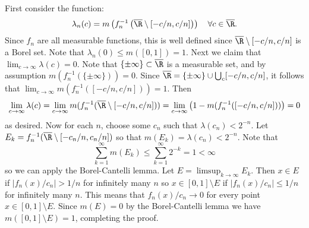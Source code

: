 \documentclass[11pt,letterpaper]{article}
\begin{document}
\begin{solution}
    First consider the function:
    \[
        \lambda_n(c) = m\left(f_n^{-1}\left(\overline{\R} \setminus \left[-c /n, c /n\right]\right)\right)\quad \forall c\in \overline{\R}
    .\] 
    Since $f_n$ are all measurable functions, this is well defined since $\overline{\R}\setminus [-c /n, c /n]$ is a Borel set. Note that $\lambda_n(0)\leq m([0,1])=1$. Next we claim that $\lim_{c\to \infty} \lambda(c)=0$. Note that $\{\pm\infty\}\subset \overline{\R}$ is a measurable set, and by assumption $m(f_n^{-1}(\{\pm\infty\}))=0$. Since $\overline{\R}=\{\pm\infty\}\cup\bigcup_c [-c /n, c /n]$, it follows that $\lim_{c\to\infty}m(f^{-1}_n([-c /n, c /n]))=1$. Then
    \[
        \lim_{c\to\infty} \lambda(c) = \lim_{c\to\infty} m(f^{-1}_n(\overline{\R}\setminus [-c /n, c /n])) = \lim_{c\to\infty}\left(1 - m(f^{-1}_n([-c /n, c /n]))\right)=0
    \]
    as desired. Now for each $n$, choose some $c_n$ such that $\lambda(c_n)<2^{-n}$. Let $E_k=f^{-1}_n(\overline{\R}\setminus [-c_n /n, c_n /n])$ so that $m(E_k)=\lambda(c_n)<2^{-n}$. Note that 
    \[
        \sum^\infty_{k=1}m(E_k)\leq \sum^\infty_{k=1}2^{-k}=1<\infty
    \]
    so we can apply the Borel-Cantelli lemma. Let $E=\limsup_{k\to \infty} E_k$. Then $x\in E$ if $|f_n(x) /c_n|>1 /n$ for infinitely many $n$ so $x\in [0,1]\setminus E$ if $|f_n(x) / c_n|\leq 1 /n$ for infinitely many $n$. This means that $f_n(x) /c_n \to 0$ for every point $x\in [0,1]\setminus E$. Since $m(E)=0$ by the Borel-Cantelli lemma we have $m([0,1]\setminus E)=1$, completing the proof. 
\end{solution}
\end{document}
